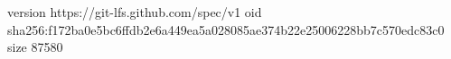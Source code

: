 version https://git-lfs.github.com/spec/v1
oid sha256:f172ba0e5bc6ffdb2e6a449ea5a028085ae374b22e25006228bb7c570edc83c0
size 87580
